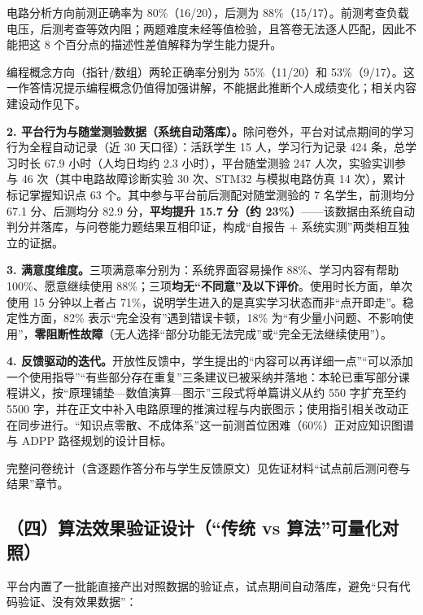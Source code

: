 \documentclass[zihao=-4,a4paper,UTF8,fontset=windows]{ctexart}
\begin{document}
电路分析方向前测正确率为 80\%（16/20），后测为 88\%（15/17）。前测考查负载电压，后测考查等效内阻；两题难度未经等值检验，且答卷无法逐人匹配，因此不能把这 8 个百分点的描述性差值解释为学生能力提升。

编程概念方向（指针/数组）两轮正确率分别为 55\%（11/20）和 53\%（9/17）。这一作答情况提示编程概念仍值得加强讲解，不能据此推断个人成绩变化；相关内容建设动作见下。

\textbf{2. 平台行为与随堂测验数据（系统自动落库）。}除问卷外，平台对试点期间的学习行为全程自动记录（近 30 天口径）：活跃学生 15 人，学习行为记录 424 条，总学习时长 67.9 小时（人均日均约 2.3 小时），平台随堂测验 247 人次，实验实训参与 46 次（其中电路故障诊断实验 30 次、STM32 与模拟电路仿真 14 次），累计标记掌握知识点 63 个。其中参与平台前后测配对随堂测验的 7 名学生，前测均分 67.1 分、后测均分 82.9 分，\textbf{平均提升 15.7 分（约 23\%）}——该数据由系统自动判分并落库，与问卷能力题结果互相印证，构成“自报告 + 系统实测”两类相互独立的证据。

\textbf{3. 满意度维度。}三项满意率分别为：系统界面容易操作 88\%、学习内容有帮助 100\%、愿意继续使用 88\%；三项\textbf{均无“不同意”及以下评价}。使用时长方面，单次使用 15 分钟以上者占 71\%，说明学生进入的是真实学习状态而非“点开即走”。稳定性方面，82\% 表示“完全没有”遇到错误卡顿，18\% 为“有少量小问题、不影响使用”，\textbf{零阻断性故障}（无人选择“部分功能无法完成”或“完全无法继续使用”）。

\textbf{4. 反馈驱动的迭代。}开放性反馈中，学生提出的“内容可以再详细一点”“可以添加一个使用指导”“有些部分存在重复”三条建议已被采纳并落地：本轮已重写部分课程讲义，按“原理铺垫—数值演算—图示”三段式将单篇讲义从约 550 字扩充至约 5500 字，并在正文中补入电路原理的推演过程与内嵌图示；使用指引相关改动正在同步进行。“知识点零散、不成体系”这一前测首位困难（60\%）正对应知识图谱与 ADPP 路径规划的设计目标。

完整问卷统计（含逐题作答分布与学生反馈原文）见佐证材料“试点前后测问卷与结果”章节。

\subsection{（四）算法效果验证设计（“传统 vs 算法”可量化对照）}


平台内置了一批能直接产出对照数据的验证点，试点期间自动落库，避免“只有代码验证、没有效果数据”：
\end{document}

